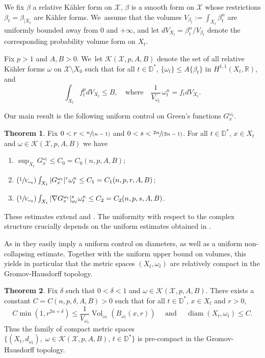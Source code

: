 \documentclass[10pt]{amsart}
\newcommand{\Psfrac}[2]{(\sfrac{#1}{#2})}
\newcommand{\spfrac}[2]{\sfrac{#1}{(#2)}}
\DeclareMathOperator{\diam}{diam}
\DeclareMathOperator{\Vol}{Vol}
\theoremstyle{definition}
\newtheorem{thmA}{Theorem}
\newcommand{\D}{\mathbb D}
\newcommand{\R}{\mathbb R}
\begin{document}
We fix $\beta$ a relative Kähler form on $\mathcal{X}$, \ie
$\beta$ is a smooth form on $\mathcal{X}$ whose restrictions $\beta_t=\beta_{|X_t}$ are Kähler forms. We~assume that the volumes $V_{\beta_t}:=\int_{X_t} \beta_t^n$ are uniformly bounded away from 0 and $+ \infty $, and let $dV_{X_t}=\beta_t^n /V_{\beta_t}$ denote the corresponding probability volume form on $X_t$.

Fix $p>1$ and $A,B>0$. We~let ${\mathcal K}(\mathcal{X},p,A,B)$ denote the set of all relative Kähler forms $\omega$ on
$\mathcal{X}\setminus X_0 $ such that for all $t \in \mathbb D^*$, $\{\omega_t\}\leq A\{\beta_t\}$ in $H^{1,1}(X_t,\R)$, and\vspace*{-3pt}
\[
\int_{X_t} f_t^p dV_{X_t} \leq B,
\quad \text{where} \quad
\frac{1}{V_{\omega_t}}\, \omega_t^n=f_t dV_{X_t}.
\]

Our main result is the following uniform control on Green's functions $G_x^{\omega_t}$.


\begin{thmA}\label{thm_A}
Fix $0<r<\spfrac{n}{n-1}$ and $0<s< \spfrac{2n}{2n-1}$.
For all $t \in \D^*$, $x \in X_t$ and $\omega \in {\mathcal K}(\mathcal{X},p,A,B)$ we have
\begin{enumerate}
\item $\sup_{X_t} G_x^{\omega_t} \leq C_0=C_0(n,p,A,B)$;

\item $\Psfrac{1}{V_{\omega_t}} \int_{X_t} |G_x^{\omega_t}|^r \omega_t^n \leq C_1=C_1(n,p,r,A,B)$;

\item $\Psfrac{1}{V_{\omega_t}} \int_{X_t} |\nabla G_x^{\omega_t}|_{\omega_t}^s \omega_t^n \leq C_2=C_2(n,p,s,A,B)$.
\end{enumerate}
\end{thmA}


These estimates extend \cite[Th.\,1 \& Th.\,2]{GPS22} and \cite[Th.\,1.1]{GPSS22}.
The uniformity with respect to the complex structure crucially depends on the uniform estimates
obtained in \cite{DnGG23}.

As in \cite{GPSS22} they easily imply a uniform control on diameters, as well
as a uniform non-collapsing estimate. Together with the uniform upper bound on volumes, this yields
in particular that the metric spaces $(X_t,\omega_t)$ are relatively compact in the Gromov-Hausdorff topology.

\begin{thmA}\label{thm_B}
Fix $\delta$ such that $0<\delta<1$ and $\omega \in {\mathcal K}(\mathcal{X},p,A,B)$.
There exists a constant $C=C(n,p,\delta,A,B)>0$ such that for all $ t\in \D^*$, $x \in X_t$ and $r>0$,\vspace*{-3pt}
\[
C \min(1,r^{2n+\delta}) \leq \frac{1}{V_{\omega_t}} \Vol_{\omega_t}(B_{\omega_t}(x,r))
\quad \text{ and } \quad
\diam(X_t,\omega_t) \leq C.
\]
Thus the family of compact metric spaces
$\{ (X_t,d_{\omega_t}), \; \omega \in {\mathcal K}(\mathcal{X},p,A,B), \, t \in \D^* \}$
is pre-compact in the Gromov-Hausdorff topology.
\end{thmA}
\end{document}
